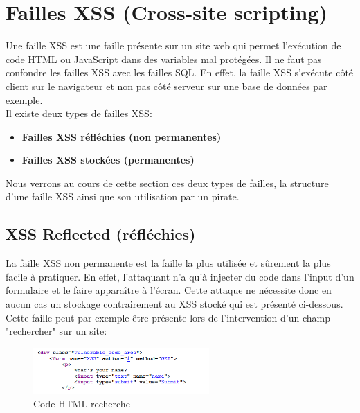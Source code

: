 \newpage

\section{Failles XSS (Cross-site scripting)}

Une faille XSS est une faille présente sur un site web qui permet l'exécution de code HTML ou JavaScript dans des variables mal protégées. Il ne faut pas confondre les failles XSS avec les failles SQL. En effet, la faille XSS s'exécute côté client sur le navigateur et non pas côté serveur sur une base de données par exemple.\\

\noindent Il existe deux types de failles XSS:

\begin{itemize}
    \item \textbf{Failles XSS réfléchies (non permanentes)}
    \item \textbf{Failles XSS stockées (permanentes)}
\end{itemize}

\noindent Nous verrons au cours de cette section ces deux types de failles, la structure d'une faille XSS ainsi que son utilisation par un pirate.

\subsection{XSS Reflected (réfléchies) }

La faille XSS non permanente est la faille la plus utilisée et sûrement la plus facile à pratiquer. En effet, l’attaquant n'a qu’à injecter du code dans l’input d’un formulaire et le faire apparaître à l’écran. Cette attaque ne nécessite donc en aucun cas un stockage contrairement au XSS stocké qui est présenté ci-dessous. Cette faille peut par exemple être présente lors de l'intervention d'un champ "rechercher" sur un site:

\begin{figure}[htp!]
  \centering
  \setlength\figureheight{7cm}
  \setlength\figurewidth{9cm}
  \includegraphics[width=0.6\textwidth]{oui/images/xss/xss.PNG}
  \caption{Code HTML recherche}
  \label{fig:courbe-tikz}
\end{figure}

